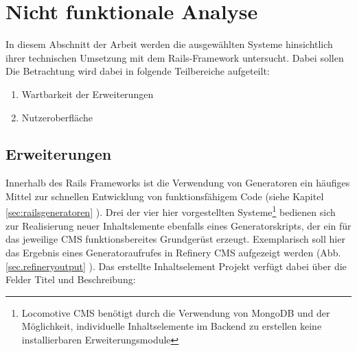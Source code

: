 \chapter{Nicht funktionale Analyse}
\label{chap:probleme}
In diesem Abschnitt der Arbeit werden die ausgewählten Systeme hinsichtlich ihrer technischen Umsetzung mit dem Rails-Framework untersucht. Dabei sollen Die Betrachtung wird dabei in folgende Teilbereiche aufgeteilt:

\begin{enumerate}
\item Wartbarkeit der Erweiterungen
\item Nutzeroberfläche
\end{enumerate}


\section{Erweiterungen}
\label{dryverstoss}
Innerhalb des Rails Frameworks ist die Verwendung von Generatoren ein häufiges Mittel zur schnellen Entwicklung von funktionsfähigem Code (siehe Kapitel \ref{sec:railsgeneratoren} ). Drei der vier hier vorgestellten Systeme\footnote{Locomotive CMS benötigt durch die Verwendung von MongoDB und der Möglichkeit, individuelle Inhaltselemente im Backend zu erstellen keine installierbaren Erweiterungsmodule} bedienen sich zur Realisierung neuer Inhaltslemente ebenfalls eines Generatorskripts, der ein für das jeweilige CMS funktionsbereites Grundgerüst erzeugt. Exemplarisch soll hier das Ergebnis eines Generatoraufrufes in Refinery CMS aufgezeigt werden (Abb. \ref{sec.refineryoutput} ). Das erstellte Inhaltselement Projekt verfügt dabei über die Felder Titel und Beschreibung:


%

